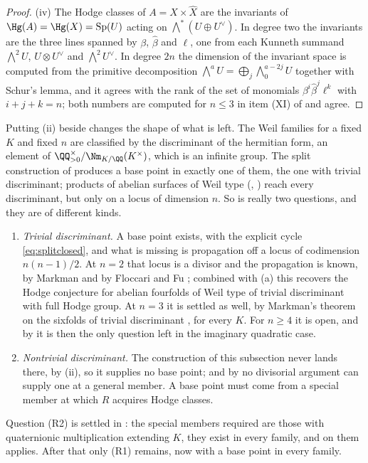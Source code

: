 \begin{proof}
(iv) The Hodge classes of $A=X\times\widehat{X}$ are the invariants of
$\Hg(A)=\Hg(X)=\mathrm{Sp}(U)$ acting on
$\bigwedge^{*}(U\oplus U^{\vee})$. In degree two the invariants are the three
lines spanned by $\beta$, $\widehat{\beta}$ and $\ell$, one from each Kunneth
summand $\bigwedge^{2}U$, $U\otimes U^{\vee}$ and $\bigwedge^{2}U^{\vee}$.
In degree $2n$ the dimension of the invariant space is computed from the
primitive decomposition $\bigwedge^{a}U=\bigoplus_{j}\bigwedge^{a-2j}_{0}U$
together with Schur's lemma, and it agrees with the rank of the set of
monomials $\beta^{i}\widehat{\beta}^{j}\ell^{k}$ with $i+j+k=n$; both numbers
are computed for $n\le3$ in item (XI) of  and agree.
\end{proof}

\begin{remark}\label{rem:residualmap}
Putting (ii) beside  changes the shape
of what is left. The Weil families for a fixed $K$ and fixed $n$ are
classified by the discriminant of the hermitian form, an element of
$\QQ^{\times}_{>0}/\Nm_{K/\QQ}(K^{\times})$, which is an infinite group. The
split construction of  produces a base point in exactly one of
them, the one with trivial discriminant; products of abelian surfaces of Weil
type (, ) reach every discriminant, but
only on a locus of dimension $n$. So  is really two
questions, and they are of different kinds.
\begin{enumerate}[label=\textup{(R\arabic*)},leftmargin=2.8em,itemsep=2pt]
\item \emph{Trivial discriminant.} A base point exists, with the explicit
  cycle \eqref{eq:splitclosed}, and what is missing is propagation off a locus
  of codimension $n(n-1)/2$. At $n=2$ that locus is a divisor and the
  propagation is known, by Markman \cite{Mar25a,Mar25b} and by Floccari and Fu
  \cite{FF26}; combined with (a) this recovers the Hodge
  conjecture for abelian fourfolds of Weil type of trivial discriminant with
  full Hodge group. At $n=3$ it is settled as well, by Markman's theorem on
  the sixfolds of trivial discriminant \cite{Mar25a,Mar25b}, for every $K$.
  For $n\ge4$ it is open, and by  it is then the only
  question left in the imaginary quadratic case.
\item \emph{Nontrivial discriminant.} The construction of this subsection
  never lands there, by (ii), so it supplies no base
  point; and by  no divisorial argument can supply one at
  a general member. A base point must come from a special member at which $R$
  acquires Hodge classes.
\end{enumerate}
Question (R2) is settled in : the special members
required are those with quaternionic multiplication extending $K$, they exist
in every family, and on them  applies. After that only
(R1) remains, now with a base point in every family.
\end{remark}

